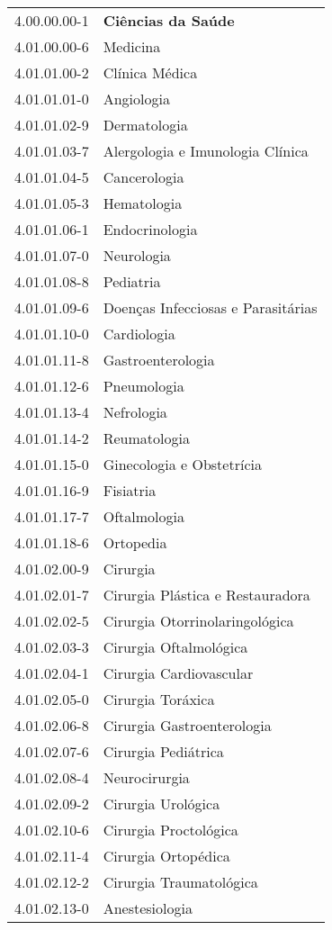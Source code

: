 \begin{longtable}[c]{p{2.15cm}p{13cm}}
4.00.00.00-1 & \textbf{Ciências da Saúde} \\
4.01.00.00-6 & Medicina \\
4.01.01.00-2 & Clínica Médica \\
4.01.01.01-0 & Angiologia \\
4.01.01.02-9 & Dermatologia \\
4.01.01.03-7 & Alergologia e Imunologia Clínica \\
4.01.01.04-5 & Cancerologia \\
4.01.01.05-3 & Hematologia \\
4.01.01.06-1 & Endocrinologia \\
4.01.01.07-0 & Neurologia \\
4.01.01.08-8 & Pediatria \\
4.01.01.09-6 & Doenças Infecciosas e Parasitárias \\
4.01.01.10-0 & Cardiologia \\
4.01.01.11-8 & Gastroenterologia \\
4.01.01.12-6 & Pneumologia \\
4.01.01.13-4 & Nefrologia \\
4.01.01.14-2 & Reumatologia \\
4.01.01.15-0 & Ginecologia e Obstetrícia \\
4.01.01.16-9 & Fisiatria \\
4.01.01.17-7 & Oftalmologia \\
4.01.01.18-6 & Ortopedia \\
4.01.02.00-9 & Cirurgia \\
4.01.02.01-7 & Cirurgia Plástica e Restauradora \\
4.01.02.02-5 & Cirurgia Otorrinolaringológica \\
4.01.02.03-3 & Cirurgia Oftalmológica \\
4.01.02.04-1 & Cirurgia Cardiovascular \\
4.01.02.05-0 & Cirurgia Toráxica \\
4.01.02.06-8 & Cirurgia Gastroenterologia \\
4.01.02.07-6 & Cirurgia Pediátrica \\
4.01.02.08-4 & Neurocirurgia \\
4.01.02.09-2 & Cirurgia Urológica \\
4.01.02.10-6 & Cirurgia Proctológica \\
4.01.02.11-4 & Cirurgia Ortopédica \\
4.01.02.12-2 & Cirurgia Traumatológica \\
4.01.02.13-0 & Anestesiologia \\

\end{longtable}
